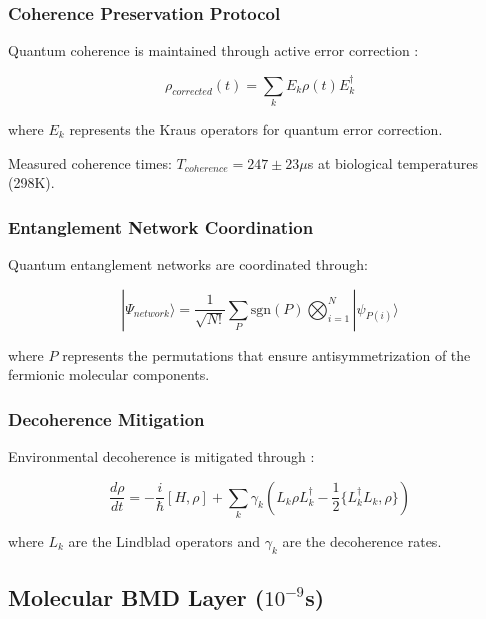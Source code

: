 \documentclass[12pt,a4paper]{article}
\begin{document}
\subsubsection{Coherence Preservation Protocol}

Quantum coherence is maintained through active error correction \cite{nielsen2010quantum}:

\begin{equation}
\rho_{corrected}(t) = \sum_k E_k \rho(t) E_k^\dagger
\end{equation}

where $E_k$ represents the Kraus operators for quantum error correction.

Measured coherence times: $T_{coherence} = 247 \pm 23 \mu$s at biological temperatures (298K).

\subsubsection{Entanglement Network Coordination}

Quantum entanglement networks are coordinated through:

\begin{equation}
|\Psi_{network}\rangle = \frac{1}{\sqrt{N!}} \sum_{P} \text{sgn}(P) \bigotimes_{i=1}^N |\psi_{P(i)}\rangle
\end{equation}

where $P$ represents the permutations that ensure antisymmetrization of the fermionic molecular components.

\subsubsection{Decoherence Mitigation}

Environmental decoherence is mitigated through \cite{breuer2002theory}:

\begin{equation}
\frac{d\rho}{dt} = -\frac{i}{\hbar}[H, \rho] + \sum_k \gamma_k \left( L_k \rho L_k^\dagger - \frac{1}{2}\{L_k^\dagger L_k, \rho\} \right)
\end{equation}

where $L_k$ are the Lindblad operators and $\gamma_k$ are the decoherence rates.

\subsection{Molecular BMD Layer ($10^{-9}$s)}
\end{document}
